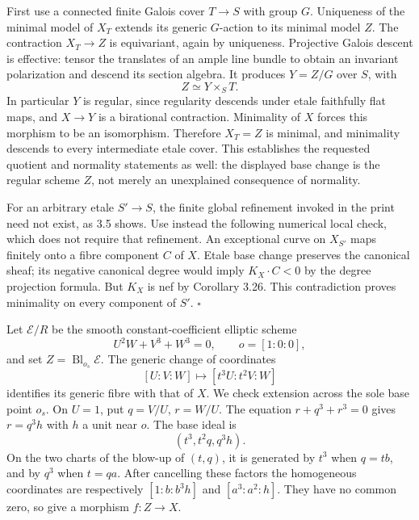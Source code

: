 \documentclass[11pt]{article}
\let\chapterexercise\exercise
\renewcommand{\exercise}[2]{\Needspace{8\baselineskip}\chapterexercise{#1}{#2}}
\begin{document}
\pf First use a connected finite Galois cover $T\to S$ with group $G$. Uniqueness of the minimal model of $X_T$ extends its generic $G$-action to its minimal model $Z$. The contraction $X_T\to Z$ is equivariant, again by uniqueness. Projective Galois descent is effective: tensor the translates of an ample line bundle to obtain an invariant polarization and descend its section algebra. It produces $Y=Z/G$ over $S$, with
\[ Z\simeq Y\times_S T. \]
In particular $Y$ is regular, since regularity descends under etale faithfully flat maps, and $X\to Y$ is a birational contraction. Minimality of $X$ forces this morphism to be an isomorphism. Therefore $X_T=Z$ is minimal, and minimality descends to every intermediate etale cover. This establishes the requested quotient and normality statements as well: the displayed base change is the regular scheme $Z$, not merely an unexplained consequence of normality.

For an arbitrary etale $S'\to S$, the finite global refinement invoked in the print need not exist, as 3.5 shows. Use instead the following numerical local check, which does not require that refinement. An exceptional curve on $X_{S'}$ maps finitely onto a fibre component $C$ of $X$. Etale base change preserves the canonical sheaf; its negative canonical degree would imply $K_X\cdot C<0$ by the degree projection formula. But $K_X$ is nef by Corollary 3.26. This contradiction proves minimality on every component of $S'$. \hfill$\square$

\pf Let $\mathcal E/R$ be the smooth constant-coefficient elliptic scheme
\[ U^2W+V^3+W^3=0,\qquad o=[1:0:0], \]
and set $Z=\operatorname{Bl}_{o_s}\mathcal E$. The generic change of coordinates
\[ [U:V:W]\longmapsto[t^3U:t^2V:W] \]
identifies its generic fibre with that of $X$. We check extension across the sole base point $o_s$. On $U=1$, put $q=V/U$, $r=W/U$. The equation $r+q^3+r^3=0$ gives $r=q^3h$ with $h$ a unit near $o$. The base ideal is
\[ (t^3,t^2q,q^3h). \]
On the two charts of the blow-up of $(t,q)$, it is generated by $t^3$ when $q=tb$, and by $q^3$ when $t=qa$. After cancelling these factors the homogeneous coordinates are respectively $[1:b:b^3h]$ and $[a^3:a^2:h]$. They have no common zero, so give a morphism $f:Z\to X$.
\end{document}
